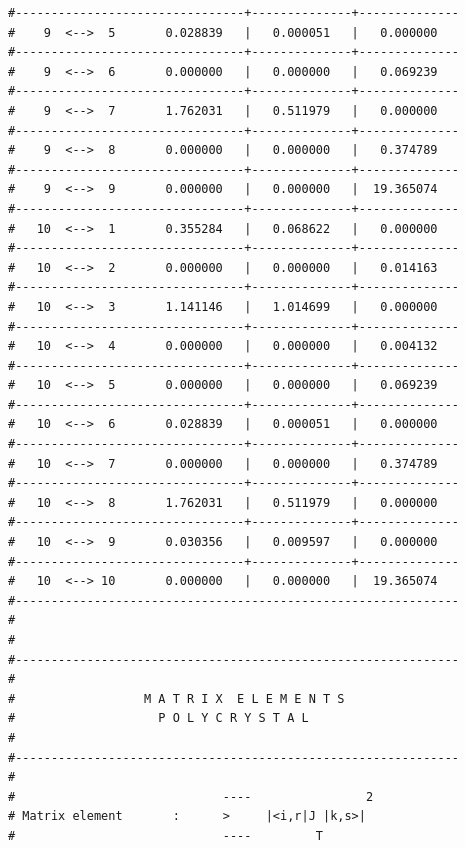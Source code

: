 \begin{enumerate}
{\begin{verbatim}
#--------------------------------+--------------+--------------
#    9  <-->  5       0.028839   |   0.000051   |   0.000000   
#--------------------------------+--------------+--------------
#    9  <-->  6       0.000000   |   0.000000   |   0.069239   
#--------------------------------+--------------+--------------
#    9  <-->  7       1.762031   |   0.511979   |   0.000000   
#--------------------------------+--------------+--------------
#    9  <-->  8       0.000000   |   0.000000   |   0.374789   
#--------------------------------+--------------+--------------
#    9  <-->  9       0.000000   |   0.000000   |  19.365074   
#--------------------------------+--------------+--------------
#   10  <-->  1       0.355284   |   0.068622   |   0.000000   
#--------------------------------+--------------+--------------
#   10  <-->  2       0.000000   |   0.000000   |   0.014163   
#--------------------------------+--------------+--------------
#   10  <-->  3       1.141146   |   1.014699   |   0.000000   
#--------------------------------+--------------+--------------
#   10  <-->  4       0.000000   |   0.000000   |   0.004132   
#--------------------------------+--------------+--------------
#   10  <-->  5       0.000000   |   0.000000   |   0.069239   
#--------------------------------+--------------+--------------
#   10  <-->  6       0.028839   |   0.000051   |   0.000000   
#--------------------------------+--------------+--------------
#   10  <-->  7       0.000000   |   0.000000   |   0.374789   
#--------------------------------+--------------+--------------
#   10  <-->  8       1.762031   |   0.511979   |   0.000000   
#--------------------------------+--------------+--------------
#   10  <-->  9       0.030356   |   0.009597   |   0.000000   
#--------------------------------+--------------+--------------
#   10  <--> 10       0.000000   |   0.000000   |  19.365074   
#-------------------------------------------------------------- 
#
#
#-------------------------------------------------------------- 
#                                                              
#                  M A T R I X  E L E M E N T S                
#                    P O L Y C R Y S T A L                     
#                                                              
#--------------------------------------------------------------
#                                                              
#                             ----                2            
# Matrix element       :      >     |<i,r|J |k,s>|             
#                             ----         T                   

\end{verbatim}}
\end{enumerate}
